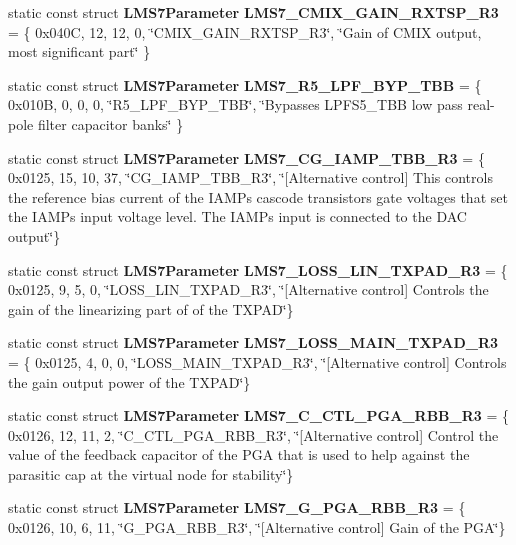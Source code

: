 \begin{DoxyCompactItemize}
\item 
static const struct {\bf L\+M\+S7\+Parameter} {\bf L\+M\+S7\+\_\+\+C\+M\+I\+X\+\_\+\+G\+A\+I\+N\+\_\+\+R\+X\+T\+S\+P\+\_\+\+R3} = \{ 0x040\+C, 12, 12, 0, \char`\"{}\+C\+M\+I\+X\+\_\+\+G\+A\+I\+N\+\_\+\+R\+X\+T\+S\+P\+\_\+\+R3\char`\"{}, \char`\"{}\+Gain of C\+M\+I\+X output, most significant part\char`\"{} \}
\item 
static const struct {\bf L\+M\+S7\+Parameter} {\bf L\+M\+S7\+\_\+\+R5\+\_\+\+L\+P\+F\+\_\+\+B\+Y\+P\+\_\+\+T\+BB} = \{ 0x010\+B, 0, 0, 0, \char`\"{}\+R5\+\_\+\+L\+P\+F\+\_\+\+B\+Y\+P\+\_\+\+T\+B\+B\char`\"{}, \char`\"{}\+Bypasses L\+P\+F\+S5\+\_\+\+T\+B\+B low pass real-\/pole filter capacitor banks\char`\"{} \}
\item 
static const struct {\bf L\+M\+S7\+Parameter} {\bf L\+M\+S7\+\_\+\+C\+G\+\_\+\+I\+A\+M\+P\+\_\+\+T\+B\+B\+\_\+\+R3} = \{ 0x0125, 15, 10, 37, \char`\"{}\+C\+G\+\_\+\+I\+A\+M\+P\+\_\+\+T\+B\+B\+\_\+\+R3\char`\"{}, \char`\"{}[\+Alternative control] This controls the reference bias current of the I\+A\+M\+P\textquotesingle{}s cascode transistors gate voltages that set the I\+A\+M\+P\textquotesingle{}s input voltage level. The I\+A\+M\+P\textquotesingle{}s input is connected to the D\+A\+C output\char`\"{}\}
\item 
static const struct {\bf L\+M\+S7\+Parameter} {\bf L\+M\+S7\+\_\+\+L\+O\+S\+S\+\_\+\+L\+I\+N\+\_\+\+T\+X\+P\+A\+D\+\_\+\+R3} = \{ 0x0125, 9, 5, 0, \char`\"{}\+L\+O\+S\+S\+\_\+\+L\+I\+N\+\_\+\+T\+X\+P\+A\+D\+\_\+\+R3\char`\"{}, \char`\"{}[\+Alternative control] Controls the gain of the linearizing part of of the T\+X\+P\+A\+D\char`\"{}\}
\item 
static const struct {\bf L\+M\+S7\+Parameter} {\bf L\+M\+S7\+\_\+\+L\+O\+S\+S\+\_\+\+M\+A\+I\+N\+\_\+\+T\+X\+P\+A\+D\+\_\+\+R3} = \{ 0x0125, 4, 0, 0, \char`\"{}\+L\+O\+S\+S\+\_\+\+M\+A\+I\+N\+\_\+\+T\+X\+P\+A\+D\+\_\+\+R3\char`\"{}, \char`\"{}[\+Alternative control] Controls the gain output power of the T\+X\+P\+A\+D\char`\"{}\}
\item 
static const struct {\bf L\+M\+S7\+Parameter} {\bf L\+M\+S7\+\_\+\+C\+\_\+\+C\+T\+L\+\_\+\+P\+G\+A\+\_\+\+R\+B\+B\+\_\+\+R3} = \{ 0x0126, 12, 11, 2, \char`\"{}\+C\+\_\+\+C\+T\+L\+\_\+\+P\+G\+A\+\_\+\+R\+B\+B\+\_\+\+R3\char`\"{}, \char`\"{}[\+Alternative control] Control the value of the feedback capacitor of the P\+G\+A that is used to help against the parasitic cap at the virtual node for stability\char`\"{}\}
\item 
static const struct {\bf L\+M\+S7\+Parameter} {\bf L\+M\+S7\+\_\+\+G\+\_\+\+P\+G\+A\+\_\+\+R\+B\+B\+\_\+\+R3} = \{ 0x0126, 10, 6, 11, \char`\"{}\+G\+\_\+\+P\+G\+A\+\_\+\+R\+B\+B\+\_\+\+R3\char`\"{}, \char`\"{}[\+Alternative control] Gain of the P\+G\+A\char`\"{}\}

\end{DoxyCompactItemize}
